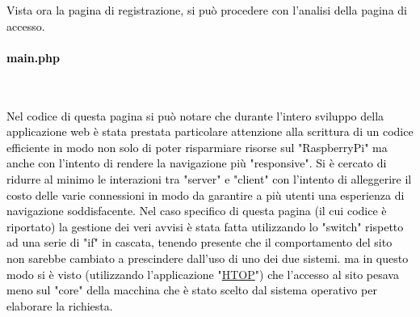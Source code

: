   
  \textcolor{black}{Vista ora la pagina di registrazione, si può procedere con l'analisi della pagina di accesso.}\\
  
  \paragraph{\textcolor{black}{main.php}}\leavevmode\\
  
  \raggedright
  \textcolor{black}{Nel codice di questa pagina si può notare che durante l'intero sviluppo della applicazione web è stata prestata particolare attenzione alla scrittura di un codice efficiente in modo non solo di poter risparmiare risorse sul "RaspberryPi" ma anche con l'intento di rendere la navigazione più "responsive". Si è cercato di ridurre al minimo le interazioni tra "server" e "client" con l'intento di alleggerire il costo delle varie connessioni in modo da garantire a più utenti una esperienza di navigazione soddisfacente. Nel caso specifico di questa pagina (il cui codice è riportato) la gestione dei veri avvisi è stata fatta utilizzando lo "switch" rispetto ad una serie di "if" in cascata, tenendo presente che il comportamento del sito non sarebbe cambiato a prescindere dall'uso di uno dei due sistemi. ma in questo modo si è visto (utilizzando l'applicazione "\href{https://htop.dev/}{HTOP}") che l'accesso al sito pesava meno sul "core" della macchina che è stato scelto dal sistema operativo per elaborare la richiesta.}\\
  
